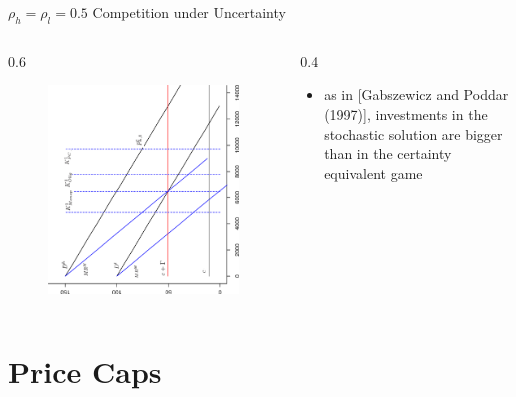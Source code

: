 \begin{frame} {$\rho_h = \rho_l = 0.5$ Competition under Uncertainty}
\begin{columns}
\begin{column} {0.6\textwidth}
\begin{figure}[h]
\centering
\includegraphics[width=1.0\textwidth, angle=270]{33}
    \label{fig:1}            
\end{figure}
\end{column}

\begin{column} {0.4\textwidth}



\begin{itemize}
\item as in [Gabszewicz and Poddar (1997)], investments in the stochastic solution are bigger than in the certainty equivalent game
\end{itemize}
\end{column}
\end{columns}
\end{frame}


\section{Price Caps}

